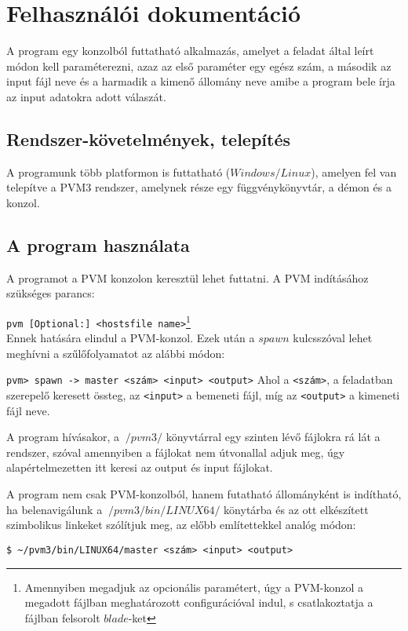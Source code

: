 \documentclass[12pt]{article}
\begin{document}
\section{Felhasználói dokumentáció}

A program egy konzolból futtatható alkalmazás, amelyet a feladat által leírt módon kell paraméterezni, azaz az első paraméter egy egész szám, a második az input fájl neve és a harmadik a kimenő állomány neve amibe a program bele írja az input adatokra adott válaszát.

\subsection{Rendszer-követelmények, telepítés}

A programunk több platformon is futtatható ($Windows/Linux$), amelyen fel van telepítve a PVM3 rendszer, amelynek része egy függvénykönyvtár, a démon és a konzol.

\subsection{A program használata}

A programot  a PVM konzolon keresztül lehet futtatni. A PVM indításához szükséges parancs: 

\verb|pvm [Optional:] <hostsfile name>|\footnote{Amennyiben megadjuk az opcionális paramétert, úgy a PVM-konzol a megadott fájlban meghatározott configurációval indul, s csatlakoztatja a fájlban felsorolt $blade$-ket} \\
Ennek hatására elindul a PVM-konzol. Ezek után a $spawn$ kulcsszóval lehet meghívni a szűlőfolyamatot az alábbi módon: 

\verb|pvm> spawn -> master <szám> <input> <output>|
Ahol a \verb|<szám>|, a feladatban szerepelő keresett össteg, az \verb|<input>| a bemeneti fájl, míg az \verb|<output>| a kimeneti fájl neve.

A program hívásakor, a $~/pvm3/$ könyvtárral egy szinten lévő fájlokra rá lát a rendszer, szóval amennyiben a fájlokat nem útvonallal adjuk meg, úgy alapértelmezetten itt keresi az output és input fájlokat.

A program nem csak PVM-konzolból, hanem futatható állományként is indítható, ha belenavigálunk a $~/pvm3/bin/LINUX64/$ könytárba és az ott elkészített szimbolikus linkeket szólítjuk meg, az előbb említettekkel analóg módon:

\verb|$ ~/pvm3/bin/LINUX64/master <szám> <input> <output>|
\end{document}
